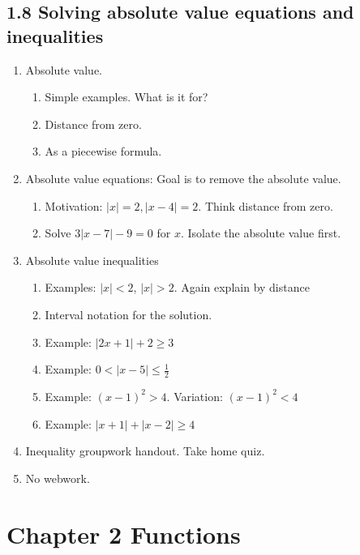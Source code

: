 \documentclass{article}
\begin{document}
\subsection{1.8 Solving absolute value equations and inequalities}

\begin{enumerate}
\item Absolute value.
\begin{enumerate}
\item Simple examples. What is it for?
\item Distance from zero.
\item As a piecewise formula.
\end{enumerate}


\item Absolute value equations: Goal is to remove the absolute value.
\begin{enumerate}
\item Motivation: $|x|=2, |x-4|=2$. Think distance from zero.
\item Solve $3|x-7|-9=0$ for $x$. Isolate the absolute value first. 
\end{enumerate}

\item Absolute value inequalities
\begin{enumerate}
\item Examples: $|x|<2$, $|x|>2$. Again explain by distance
\item Interval notation for the solution.
\item Example: $|2x+1|+2 \geq 3$
\item Example: $0<|x-5|\leq\frac{1}{2}$
\item Example: $(x-1)^2 >4$. Variation: $(x-1)^2<4$
\item Example: $|x+1| + |x-2| \geq 4$
\end{enumerate}

\item Inequality groupwork handout. Take home quiz.
\item No webwork.
\end{enumerate}


\section{Chapter 2 Functions}
\end{document}
